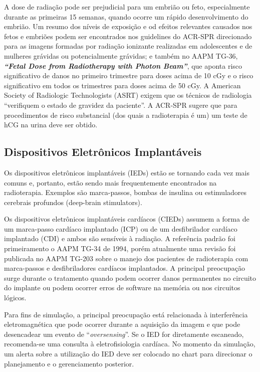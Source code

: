 \documentclass[11pt,a4paper]{article}
\begin{document}
	A dose de radiação pode ser prejudicial para um embrião ou feto, especialmente durante as primeiras 15 semanas, quando ocorre um rápido desenvolvimento do embrião. Um resumo dos níveis de exposição e od efeitos relevantes causados nos fetos e embriões podem ser encontrados nos guidelines do ACR-SPR direcionado para as imagens formadas por radiação ionizante realizadas em adolescentes e de  mulheres grávidas ou potencialmente grávidas; e também no AAPM TG-36, \textit{\textbf{``Fetal Dose from Radiotherapy with Photon Beam''}}, que aponta risco significativo de danos no primeiro trimestre para doses acima de 10 cGy e o risco significativo em todos os trimestres para doses acima de 50 cGy. A American Society of Radiologic Technologists (ASRT) exigem que os técnicos de radiologia “verifiquem o estado de gravidez da paciente”. A ACR-SPR sugere que para procedimentos de risco substancial (dos quais a radioterapia é um) um teste de hCG na urina deve ser obtido.

\subsection*{Dispositivos Eletrônicos Implantáveis}

	Os dispositivos eletrônicos implantáveis (IEDs) estão se tornando cada vez mais comuns e, portanto, estão sendo mais frequentemente encontrados na radioterapia. Exemplos são marca-passos, bombas de insulina ou estimuladores cerebrais profundos (deep-brain stimulators). 

	Os dispositivos eletrônicos implantáveis cardíacos (CIEDs) assumem a forma de um marca-passo cardíaco implantado (ICP) ou de um desfibrilador cardíaco implantado (CDI) e ambos são sensíveis à radiação. A referência padrão foi primeiramento o AAPM TG-34 de 1994, porém atualmente uma revisão foi publicada no AAPM TG-203 sobre o manejo dos pacientes de radioterapia com marca-passos e desfibriladores cardíacos implantados. A principal preocupação surge durante o tratamento quando podem ocorrer danos permanentes no circuito do implante ou podem ocorrer erros de software na memória ou nos circuitos lógicos.
	
	Para fins de simulação, a principal preocupação está relacionada à interferência eletromagnética que pode ocorrer durante a aquisição da imagem e que pode desencadear um evento de ``\textit{oversensing}''. Se o IED for diretamente escaneado, recomenda-se uma consulta à eletrofisiologia cardíaca. No momento da simulação, um alerta sobre a utilização do IED deve ser colocado no chart para direcionar o planejamento e o gerenciamento posterior.
	
\end{document}

